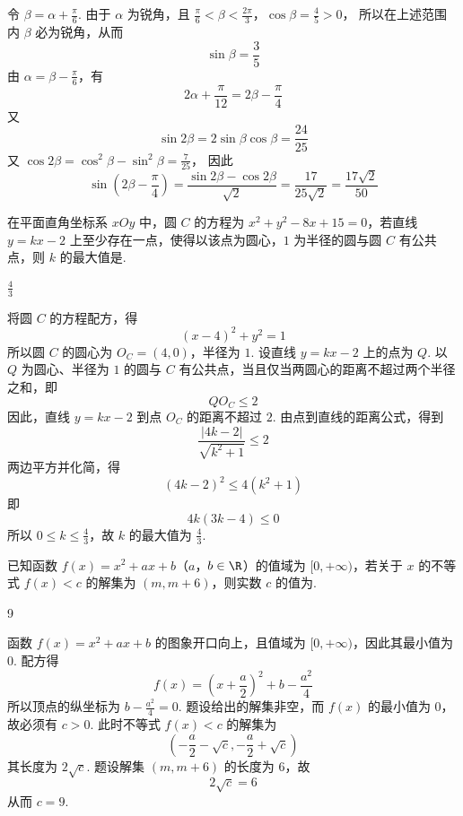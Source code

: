\begin{solution}
令 \(\beta=\alpha+\frac{\pi}{6}\). 由于 \(\alpha\) 为锐角，且
\(\frac{\pi}{6}<\beta<\frac{2\pi}{3}\)，\(\cos\beta=\frac45>0\)，
所以在上述范围内 \(\beta\) 必为锐角，从而
\[
\sin\beta=\frac35
\]
由 \(\alpha=\beta-\frac{\pi}{6}\)，有
\[
2\alpha+\frac{\pi}{12}=2\beta-\frac{\pi}{4}
\]
又
\[
\sin2\beta=2\sin\beta\cos\beta=\frac{24}{25}
\]
又 \(\cos2\beta=\cos^{2}\beta-\sin^{2}\beta=\frac{7}{25}\)，
因此
\[
\sin\left(2\beta-\frac{\pi}{4}\right)=\frac{\sin2\beta-\cos2\beta}{\sqrt{2}}=\frac{17}{25\sqrt{2}}=\frac{17\sqrt{2}}{50}
\]
\end{solution}

\begin{problem}
在平面直角坐标系 \(xOy\) 中，圆 \(C\) 的方程为 \(x^2 + y^2 - 8x + 15 = 0\)，若直线 \(y = kx - 2\) 上至少存在一点，使得以该点为圆心，\(1\) 为半径的圆与圆 \(C\) 有公共点，则 \(k\) 的最大值是\fillinblank{}.
\end{problem}

\begin{answer}
\(\frac{4}{3}\)
\end{answer}

\begin{solution}
将圆 \(C\) 的方程配方，得
\[
(x-4)^{2}+y^{2}=1
\]
所以圆 \(C\) 的圆心为 \(O_{C}=(4,0)\)，半径为 \(1\). 设直线 \(y=kx-2\) 上的点为 \(Q\). 以 \(Q\) 为圆心、半径为 \(1\) 的圆与 \(C\) 有公共点，当且仅当两圆心的距离不超过两个半径之和，即
\[
QO_{C}\leqslant2
\]
因此，直线 \(y=kx-2\) 到点 \(O_{C}\) 的距离不超过 \(2\). 由点到直线的距离公式，得到
\[
\frac{|4k-2|}{\sqrt{k^{2}+1}}\leqslant2
\]
两边平方并化简，得
\[
(4k-2)^{2}\leqslant4(k^{2}+1)
\]
即
\[
4k(3k-4)\leqslant0
\]
所以 \(0\leqslant k\leqslant\frac43\)，故 \(k\) 的最大值为 \(\frac43\).
\end{solution}

\begin{problem}
已知函数 \(f(x)=x^2+ax+b\)（\(a\)，\(b\in\R\)）的值域为 \([0,+\infty)\)，若关于 \(x\) 的不等式 \(f(x)<c\) 的解集为 \((m,m+6)\)，则实数 \(c\) 的值为\fillinblank{}.
\end{problem}

\begin{answer}
9
\end{answer}

\begin{solution}
函数 \(f(x)=x^{2}+ax+b\) 的图象开口向上，且值域为 \([0,+\infty)\)，因此其最小值为 \(0\). 配方得
\[
f(x)=\left(x+\frac a2\right)^{2}+b-\frac{a^{2}}{4}
\]
所以顶点的纵坐标为 \(b-\frac{a^{2}}{4}=0\). 题设给出的解集非空，而 \(f(x)\) 的最小值为 \(0\)，故必须有 \(c>0\). 此时不等式 \(f(x)<c\) 的解集为
\[
\left(-\frac a2-\sqrt{c},-\frac a2+\sqrt{c}\right)
\]
其长度为 \(2\sqrt{c}\). 题设解集 \((m,m+6)\) 的长度为 \(6\)，故
\[
2\sqrt{c}=6
\]
从而 \(c=9\).
\end{solution}

